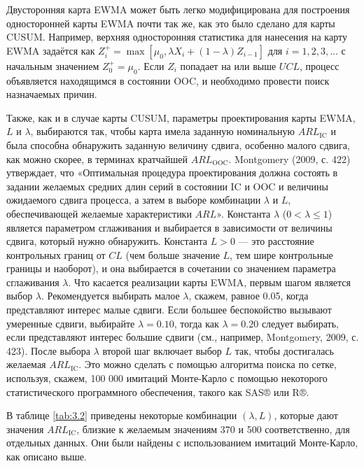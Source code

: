 Двусторонняя карта EWMA может быть легко модифицирована для построения односторонней карты EWMA почти так же, как это было сделано для карты CUSUM. Например, верхняя односторонняя статистика для нанесения на карту EWMA задаётся как \(Z_i^{+} = \max[\mu_0, \lambda X_i + (1 - \lambda) Z_{i-1}]\) для \(i = 1, 2, 3, \ldots\) с начальным значением \(Z_0^{+} = \mu_0\). Если \(Z_i\) попадает на или выше \(UCL\), процесс объявляется находящимся в состоянии OOC, и необходимо провести поиск назначаемых причин.

Также, как и в случае карты CUSUM, параметры проектирования карты EWMA, \(L\) и \(\lambda\), выбираются так, чтобы карта имела заданную номинальную \(ARL_{\text{IC}}\) и была способна обнаружить заданную величину сдвига, особенно малого сдвига, как можно скорее, в терминах кратчайшей \(ARL_{\text{OOC}}\). Montgomery (2009, с. 422) утверждает, что «Оптимальная процедура проектирования должна состоять в задании желаемых средних длин серий в состоянии IC и OOC и величины ожидаемого сдвига процесса, а затем в выборе комбинации \(\lambda\) и \(L\), обеспечивающей желаемые характеристики \(ARL\)». Константа \(\lambda\) (\(0 < \lambda \leq 1\)) является параметром сглаживания и выбирается в зависимости от величины сдвига, который нужно обнаружить. Константа \(L > 0\) — это расстояние контрольных границ от \(CL\) (чем больше значение \(L\), тем шире контрольные границы и наоборот), и она выбирается в сочетании со значением параметра сглаживания \(\lambda\). Что касается реализации карты EWMA, первым шагом является выбор \(\lambda\). Рекомендуется выбирать малое \(\lambda\), скажем, равное 0.05, когда представляют интерес малые сдвиги. Если большее беспокойство вызывают умеренные сдвиги, выбирайте \(\lambda = 0.10\), тогда как \(\lambda = 0.20\) следует выбирать, если представляют интерес большие сдвиги (см., например, Montgomery, 2009, с. 423). После выбора \(\lambda\) второй шаг включает выбор \(L\) так, чтобы достигалась желаемая \(ARL_{\text{IC}}\). Это можно сделать с помощью алгоритма поиска по сетке, используя, скажем, 100 000 имитаций Монте-Карло с помощью некоторого статистического программного обеспечения, такого как SAS® или R®.

В таблице \ref{tab:3.2} приведены некоторые комбинации \((\lambda, L)\), которые дают значения \(ARL_{\text{IC}}\), близкие к желаемым значениям 370 и 500 соответственно, для отдельных данных. Они были найдены с использованием имитаций Монте-Карло, как описано выше.

